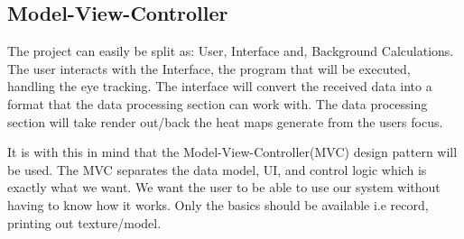 
\subsection{Model-View-Controller} 
\begin{flushleft}
The project can easily be split as: User, Interface and, Background Calculations. The user interacts with the Interface, the program that will be executed, handling the eye tracking. The interface will convert the received data into a format that the data processing section can work with. The data processing section will take render out/back the heat maps generate from the users focus.

It is with this in mind that the Model-View-Controller(MVC) design pattern will be used.
The MVC separates the data model, UI, and control logic which is exactly what we want. We want the user to be able to use our system without having to know how it works. Only the basics should be available i.e record, printing out texture/model.
\end{flushleft}